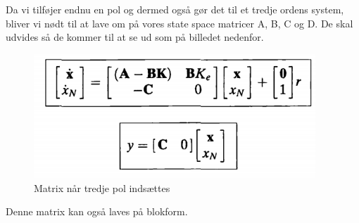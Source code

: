 Da vi tilføjer endnu en pol og dermed også gør det til et tredje ordens system, bliver vi nødt til at lave om på vores state space matricer A, B, C og D. De skal udvides så de kommer til at se ud som på billedet nedenfor.

\begin{figure}[H]
	\centering
	\includegraphics[width = 300pt]{Img/SteadyState_matrix.png}
	\caption{Matrix når tredje pol indsættes}
	\label{fig:SteadyStateMatrix}
\end{figure}

Denne matrix kan også laves på blokform. 
